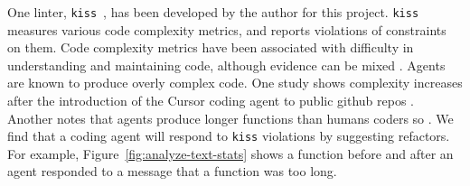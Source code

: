 \documentclass[11pt]{article}
\begin{document}
 One linter, \texttt{kiss}~\cite{kiss2026structural}, has been developed by the author
 for this project. \texttt{kiss} measures various code complexity metrics, and reports violations of constraints on
 them. Code complexity metrics have been associated \cite{antinyan,sjoberg} with difficulty in understanding and
  maintaining code, although evidence can be mixed \cite{useful}. Agents are known to produce overly complex code. One
  study shows complexity increases after the introduction of the Cursor coding agent to public github repos
   \cite{he2026speedcostqualitycursor}. Another notes that agents produce longer functions than humans coders so
    \cite{ProgramBench}. We find that a
 coding agent will respond to \texttt{kiss} violations by suggesting refactors. For example,
  Figure~\ref{fig:analyze-text-stats} 
 shows a function before and after an agent responded to a message that a function was too long.
\end{document}
